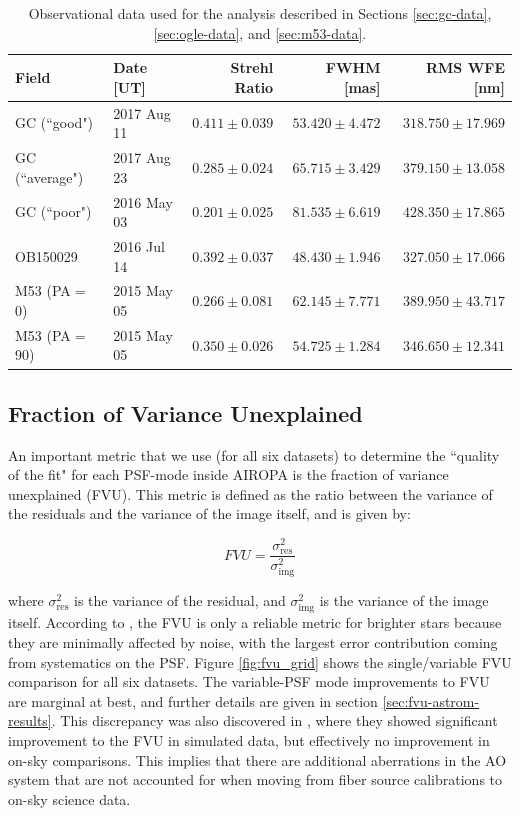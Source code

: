 \documentclass[]{spie}  %
\begin{document}
\begin{table}[!ht]
\centering
\caption{Observational data used for the analysis described in Sections \ref{sec:gc-data}, \ref{sec:ogle-data}, and \ref{sec:m53-data}.} \label{tab:fields-metrics}
\begin{tabular}{|l|l|r|r|r|}
\hline
        Field &  Date [UT] &  Strehl Ratio &  FWHM [mas] &  RMS WFE [nm] \\\hline\hline
        GC (``good") &   2017 Aug 11 & $0.411 \pm 0.039$ & $53.420 \pm 4.472$ & $318.750 \pm 17.969$ \\
        GC (``average") &   2017 Aug 23 & $0.285 \pm 0.024$ & $65.715 \pm 3.429$ & $379.150 \pm 13.058$ \\
        GC (``poor") &   2016 May 03 & $0.201 \pm 0.025$ & $81.535 \pm 6.619$ & $428.350 \pm 17.865$ \\
        OB150029 &    2016 Jul 14 &  $0.392 \pm 0.037$ & $48.430 \pm 1.946$ & $327.050 \pm 17.066$ \\
        M53 (PA$=$0) &   2015 May 05 &  $0.266 \pm 0.081$ & $62.145 \pm 7.771$ & $389.950 \pm 43.717$ \\
        M53 (PA$=$90) &   2015 May 05 & $0.350 \pm 0.026$ & $54.725 \pm 1.284$ & $346.650 \pm 12.341$ \\\hline
\end{tabular}
\end{table}

\subsection{Fraction of Variance Unexplained} \label{sec:fvu}
An important metric that we use (for all six datasets) to determine the ``quality of the fit" for each PSF-mode inside AIROPA is the fraction of variance unexplained (FVU). This metric is defined as the ratio between the variance of the residuals and the variance of the image itself, and is given by:

\begin{equation}
    FVU = \frac{\sigma^{2}_{\textrm{res}}}{\sigma^{2}_{\textrm{img}}}
\end{equation}

where $\sigma^{2}_{\textrm{res}}$ is the variance of the residual, and $\sigma^{2}_{\textrm{img}}$ is the variance of the image itself. According to \cite{Ciurlo:inprep}, the FVU is only a reliable metric for brighter stars because they are minimally affected by noise, with the largest error contribution coming from systematics on the PSF. Figure \ref{fig:fvu_grid} shows the single/variable FVU comparison for all six datasets. The variable-PSF mode improvements to FVU are marginal at best, and further details are given in section \ref{sec:fvu-astrom-results}. This discrepancy was also discovered in \cite{Turri:inprep}, where they showed significant improvement to the FVU in simulated data, but effectively no improvement in on-sky comparisons. This implies that there are additional aberrations in the AO system that are not accounted for when moving from fiber source calibrations to on-sky science data.
\end{document}
